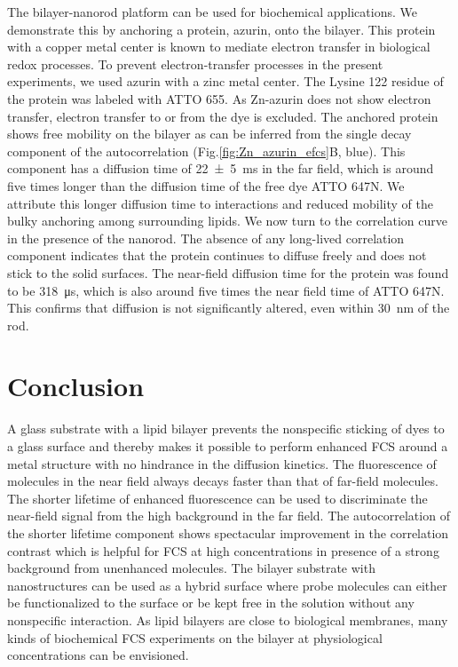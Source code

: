 The bilayer-nanorod platform can be used for biochemical applications.
We demonstrate this by anchoring a protein, azurin, onto the bilayer.
This protein with a copper metal center is known to mediate electron transfer in biological redox processes.\cite{kolczak2006azurin,Vijgenboom1997invivo}
To prevent electron-transfer processes in the present experiments, we used azurin with a zinc metal center.
The Lysine 122 residue of the protein was labeled with ATTO 655. 
As Zn-azurin does not show electron transfer, electron transfer to or from the dye is excluded.
The anchored protein shows free mobility on the bilayer as can be inferred from the single decay component of the autocorrelation (Fig.\ref{fig:Zn_azurin_efcs}B, blue).
This component has a diffusion time of \SI[separate-uncertainty = true]{22(5)}{\ms} in the far field, which is around five times longer than the diffusion time of the free dye ATTO 647N.
We attribute this longer diffusion time to interactions and reduced mobility of the bulky anchoring among surrounding lipids. 
We now turn to the correlation curve in the presence of the nanorod.
The absence of any long-lived correlation component indicates that the protein continues to diffuse freely and does not stick to the solid surfaces. 
The near-field diffusion time for the protein was found to be \SI{318}{\us}, which is also around five times the near field time of ATTO 647N.
This confirms that diffusion is not significantly altered, even within \SI{30}{\nm} of the rod.

\section{Conclusion}
A glass substrate with a lipid bilayer prevents the nonspecific sticking of dyes to a glass surface and thereby makes it possible to perform enhanced FCS around a metal structure with no hindrance in the diffusion kinetics.
The fluorescence of molecules in the near field always decays faster than that of far-field molecules.
The shorter lifetime of enhanced fluorescence can be used to discriminate the near-field signal from the high background in the far field.
The autocorrelation of the shorter lifetime component shows spectacular improvement in the correlation contrast which is helpful for FCS at high concentrations in presence of a strong background from unenhanced molecules.
The bilayer substrate with nanostructures can be used as a hybrid surface where probe molecules can either be functionalized to the surface or be kept free in the solution without any nonspecific interaction.
As lipid bilayers are close to biological membranes, many kinds of biochemical FCS experiments on the bilayer at physiological concentrations can be envisioned.

